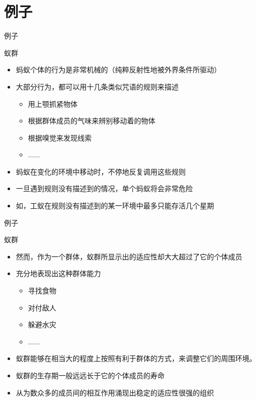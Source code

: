 \documentclass{beamer}
\newcommand*{\cjkhwxk}{\CJKfamily{cjkhwxk}}
\begin{document}
\section{例子}
\begin{frame}{例子}
	\begin{block}{蚁群}
		\begin{itemize}
			\item 蚂蚁个体的行为是非常机械的（纯粹反射性地被外界条件所驱动）
			\item 大部分行为，都可以用十几条类似咒语的规则来描述
			\begin{itemize}
				\item 用上颚抓紧物体
				\item 根据群体成员的气味来辨别移动着的物体
				\item 根据嗅觉来发现线索
				\item ......
			\end{itemize}
			\item 蚂蚁在变化的环境中移动时，不停地反复调用这些规则
			\item 一旦遇到规则没有描述到的情况，单个蚂蚁将会非常危险
			\item 如，工蚁在规则没有描述到的某一环境中最多只能存活几个星期
		\end{itemize}
	\end{block}
\end{frame}

\begin{frame}{例子}
	\begin{block}{蚁群}
		\begin{itemize}
			\item {\color{red} 然而}，作为一个群体，蚁群所显示出的适应性却大大超过了它的个体成员
			\item 充分地表现出这种群体能力
			\begin{itemize}
				\item 寻找食物
				\item 对付敌人
				\item 躲避水灾
				\item ......
			\end{itemize}
			\item 蚁群能够在相当大的程度上按照有利于群体的方式，来调整它们的周围环境。
			\item 蚁群的生存期一般远远长于它的个体成员的寿命
			\item<2-> {\cjkhwxk 从为数众多的成员间的相互作用{\color{red}涌现}出稳定的适应性很强的组织}
		\end{itemize}
	\end{block}
\end{frame}
\end{document}
